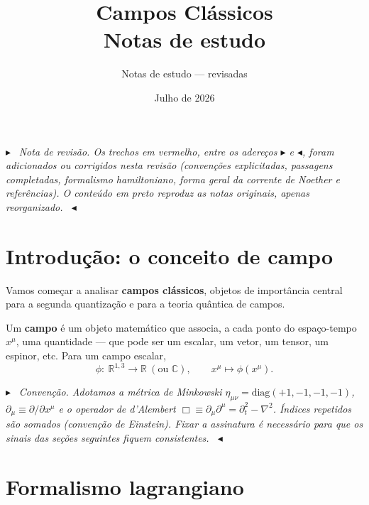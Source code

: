 \documentclass[12pt,a4paper]{article}
\title{\textbf{Campos Clássicos}\\[2pt]\large Notas de estudo}
\author{Notas de estudo --- revisadas}
\date{Julho de 2026}
\newenvironment{revbox}%
  {\par\medskip\noindent\color{revred}\ensuremath{\blacktriangleright}\ \itshape}%
  {\ \upshape\ensuremath{\blacktriangleleft}\par\medskip}
\newcommand{\pt}[1]{\partial_{#1}}
\renewcommand{\d}{\partial}
\begin{document}
\maketitle

\begin{revbox}
Nota de revisão. Os trechos em vermelho, entre os adereços
$\blacktriangleright$ e $\blacktriangleleft$, foram \emph{adicionados}
ou \emph{corrigidos} nesta revisão (convenções explicitadas, passagens
completadas, formalismo hamiltoniano, forma geral da corrente de Noether
e referências). O conteúdo em preto reproduz as notas originais,
apenas reorganizado.
\end{revbox}

\section{Introdução: o conceito de campo}

Vamos começar a analisar \textbf{campos clássicos}, objetos de importância
central para a segunda quantização e para a teoria quântica de campos.

Um \textbf{campo} é um objeto matemático que associa, a cada ponto do
espaço-tempo $x^{\mu}$, uma quantidade --- que pode ser um escalar, um
vetor, um tensor, um espinor, etc. Para um campo escalar,
\begin{equation}
  \phi:\ \mathbb{R}^{1,3}\longrightarrow \mathbb{R}\ (\text{ou } \mathbb{C}),
  \qquad x^{\mu}\longmapsto \phi(x^{\mu}).
\end{equation}

\begin{revbox}
Convenção. Adotamos a métrica de Minkowski
$\eta_{\mu\nu}=\mathrm{diag}(+1,-1,-1,-1)$, $\pt{\mu}\equiv \d/\d x^{\mu}$ e
o operador de d'Alembert $\Box\equiv \pt{\mu}\d^{\mu}=\d_t^{2}-\nabla^{2}$.
Índices repetidos são somados (convenção de Einstein). Fixar a assinatura
é necessário para que os sinais das seções seguintes fiquem consistentes.
\end{revbox}

\section{Formalismo lagrangiano}
\end{document}
